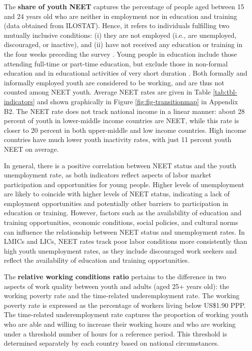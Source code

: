 \documentclass[
  a4paper, twoside, 12pt]{book}
\renewcommand{\hl}[1]{#1}
\begin{document}
The \textbf{share of youth NEET} captures the percentage of people aged between 15 and 24 years old who are neither in employment nor in education and training (data obtained from ILOSTAT). Hence, it refers to individuals fulfilling two mutually inclusive conditions: (i) they are not employed (i.e., are unemployed, discouraged, or inactive), and (ii) have not received any education or training in the four weeks preceding the survey \autocite{elder2015a}. Young people in education include those attending full-time or part-time education, but exclude those in non-formal education and in educational activities of very short duration \autocite{oecd2019}. Both formally and informally employed youth are considered to be working, and are thus not counted among NEET youth. Average NEET rates are given in Table \ref{tab:tbl-indicators} and shown graphically in Figure \ref{fig:fig-transitionmap} in Appendix B2. The NEET rate does not track national income in a linear manner: about 28 percent of youth in lower-middle income countries are NEET, while this rate is closer to 20 percent in both upper-middle and low income countries. High income countries have much lower youth inactivity rates, with just 11 percent youth NEET on average.

 \hl{In general, there is a positive correlation between NEET status and the youth unemployment rate, as both indicators reflect aspects of labor market participation and opportunities for young people. Higher levels of unemployment are likely to coincide with higher levels of NEET status, indicating a lack of employment opportunities and potentially other barriers to participation in education or training. However, factors such as the availability of education and training opportunities, economic conditions, social policies, and cultural norms can influence the relationship between NEET status and unemployment rates. In LMICs and LICs, NEET rates track poor labor conditions more consistently than high youth unemployment rates, as they include discouraged work seekers and reflect the availability of education and training opportunities.}

The \textbf{relative working conditions ratio} pertains to the difference in two aspects of work quality between youth and adults (aged 25+ years old): the working poverty rate and the time-related underemployment rate. The working poverty rate is expressed as the percentage of workers living below US\$1.90 PPP. The time-related underemployment rate captures the proportion of working youth who are able and willing to increase their working hours and who are working under a threshold number of hours for a reference period. This threshold is determined separately by each country based on national circumstances.
\end{document}
